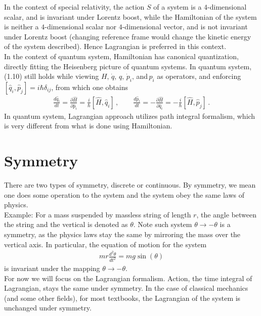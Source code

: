 \documentclass[11pt, onesided]{book}
\theoremstyle{break}
\theoremstyle{break}
\newcommand{\pd}{\partial}
\newcommand{\example}{\color{green}Example: \color{black}}
\begin{document}
In the context of special relativity, the action $S$ of a system is a $4$-dimensional scalar, and is invariant under Lorentz boost, while the Hamiltonian of the system is neither a $4$-dimensional scalar nor $4$-dimensional vector, and is not invariant under Lorentz boost (changing reference frame would change the kinetic energy of the system described). Hence Lagrangian is preferred in this context.\\

In the context of quantum system, Hamiltonian has canonical quantization, directly fitting the Heisenberg picture of quantum systems. In quantum system, (1.10) still holds while viewing $H,\,\dot{q},\,q,\,\dot{p}_i,\,$and$\,p_i$ as operators, and enforcing $[\hat{q}_i, \hat{p}_j ] =i\hbar \delta_{ij}$, from which one obtains
\begin{align*}
\frac{d\hat{q}_i}{dt}= \frac{\pd \hat{H}}{\pd \hat{p}_i} = \frac{i}{\hbar}[\hat{H},\hat{q}_i]\,,\qquad \frac{d\hat{p}_i}{dt}=- \frac{\pd \hat{H}}{\pd \hat{q}_i} = -\frac{i}{\hbar}[\hat{H},\hat{p}_j]\,.
\end{align*}
In quantum system, Lagrangian approach utilizes path integral formalism, which is very different from what is done using Hamiltonian.\newpage







\section[Symmetry]{\color{red} Symmetry\color{black}}
There are two types of symmetry, discrete or continuous. By symmetry, we mean one does some operation to the system and the system obey the same laws of physics. \\

\example For a mass suspended by massless string of length $r$, the angle between the string and the vertical is denoted as $\theta$. Note such system $\theta \to -\theta$ is a symmetry, as the physics laws stay the same by mirroring the mass over the vertical axis. In particular, the equation of motion for the system 
\begin{align*}
mr \frac{d^2 \theta}{dt^2} = mg \sin(\theta)
\end{align*}
is invariant under the mapping $\theta \to -\theta$.\\

For now we will focus on the Lagrangian formalism. Action, the time integral of Lagrangian, stays the same under symmetry. In the case of classical mechanics (and some other fields), for most textbooks, the Lagrangian of the system is unchanged under symmetry.\\
\end{document}
